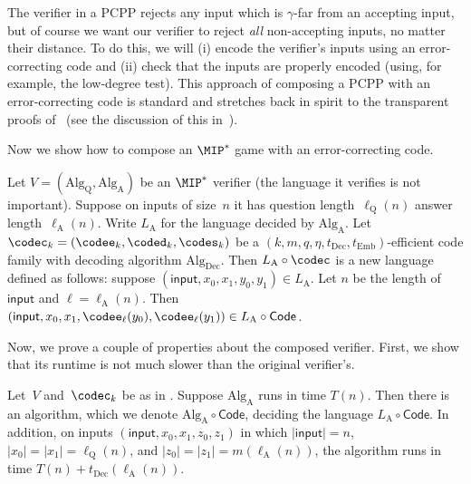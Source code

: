 The verifier in a PCPP rejects any input which is $\gamma$-far from an accepting input,
but of course we want our verifier to reject \emph{all} non-accepting inputs, no matter their distance.
To do this, we will (i) encode the verifier's inputs using an error-correcting code
and (ii) check that the inputs are properly encoded (using, for example, the low-degree test).
This approach of composing a PCPP with an error-correcting code is standard
and stretches back in spirit to the transparent proofs of~\cite{BFLS91} (see the discussion of this in~\cite{BGH+06}).

Now we show how to compose an $\MIP^*$ game with an error-correcting code.

\begin{definition}\label{def:error-correcting-answers}
Let $V = (\mathrm{Alg}_{\mathrm{Q}}, \mathrm{Alg}_{\mathrm{A}})$ be an $\MIP^*$ verifier (the language it verifies is not important).
Suppose on inputs of size~$n$ it has question length~$\ell_{\mathrm{Q}}(n)$ answer length~$\ell_{\mathrm{A}}(n)$.
Write $L_{\mathrm{A}}$ for the language decided by $\mathrm{Alg}_{\mathrm{A}}$.
Let $\codec_k = (\codee_k,\coded_k, \codes_k)$ be a $(k, m, q, \eta, t_{\mathrm{Dec}}, t_{\mathrm{Emb}})$-efficient code family with decoding algorithm $\mathrm{Alg}_{\mathrm{Dec}}$.
Then $L_{\mathrm{A}} \circ \codec$ is a new language defined as follows:
suppose $(\mathsf{input}, x_0, x_1, y_0, y_1) \in L_{\mathrm{A}}$.
Let $n$ be the length of $\mathsf{input}$ and $\ell = \ell_{\mathrm{A}}(n)$.
Then $(\mathsf{input}, x_0, x_1, \codee_{\ell}(y_0), \codee_{\ell}(y_1)) \in L_{\mathrm{A}} \circ \mathsf{Code}$.
\end{definition}

Now, we prove a couple of properties about the composed verifier.
First, we show that its runtime is not much slower than the original verifier's.

\begin{proposition}\label{prop:composed-runtime}
Let~$V$ and~$\codec_k$ be as in .
Suppose $\mathrm{Alg}_{\mathrm{A}}$ runs in time $T(n)$.
Then there is an algorithm, which we denote $\mathrm{Alg}_{\mathrm{A}} \circ \mathsf{Code}$,
deciding the language $L_{\mathrm{A}} \circ \mathsf{Code}$.
In addition, on inputs $(\mathsf{input}, x_0, x_1, z_0, z_1)$
in which $|\mathsf{input}| = n$,
$|x_0| = |x_1| = \ell_{\mathrm{Q}}(n)$,
and $|z_0| = |z_1| = m(\ell_{\mathrm{A}}(n))$,
the algorithm runs
in time $T(n) + t_{\mathrm{Dec}}(\ell_{\mathrm{A}}(n))$.
\end{proposition}

